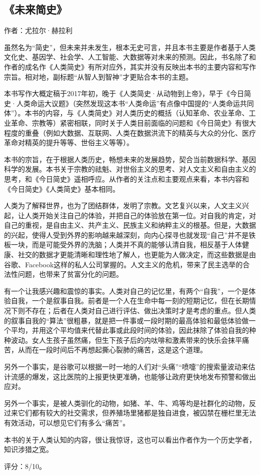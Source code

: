 \subsection{《未来简史》}

作者：尤拉尔·赫拉利

虽然名为“简史”，但未来并未发生，根本无史可言，并且本书主要是作者基于人类文化史、基因学、社会学、人工智能、大数据等对未来的预测。因此，书名除了和作者的成名作《人类简史》有所对应外，其实并没有反映出本书的主要内容和写作宗旨。相对地，副标题“从智人到智神”才更贴合本书的主题。

本书写作大概定稿于2017年初，晚于《人类简史·从动物到上帝》，早于《今日简史·人类命运大议题》（突然发现这本书“人类命运”有点像中国提的“人类命运共同体”）。本书的内容，与《人类简史》对人类历史的概括（认知革命、农业革命、工业革命、宗教等）紧密相联，同时关于人类目前面临的问题和《今日简史》有很大程度的重叠（例如大数据、互联网、人类在数据洪流下的精英与大众的分化、医疗革命对精英的提升等等、世俗主义等等）。

本书的宗旨，在于根据人类历史，畅想未来的发展趋势，契合当前数据科学、基因科学的发展。本书关于宗教的祛魁、对世俗主义的思考、对人文主义和自由主义的思考，和《今日简史》遥相呼应。从作者的关注点和主要观点来看，本书内容和《今日简史》《人类简史》基本相同。

人类为了解释世界，也为了团结群体，发明了宗教。文艺复兴以来，人文主义兴起，让人类开始关注自己的体验，并把自己的体验放在第一位。对自我的肯定，对自己的重视，是自由主义、共产主义、民族主义和纳粹主义的根基。但是，大数据的兴起，使得人受到外界的影响越来越深刻，向内心探寻也就发现“自己”并不是铁板一块，而是可能受外界的洗脑；人类并不真的能够认清自我，相反基于人体健康、社交的数据才更能清晰和理性地了解人，也更能为人做决定，而这些数据是由谷歌、Facebook这样的私人公司掌握的。人文主义的危机，带来了民主选举的合法性问题，也带来了贫富分化的问题。

有一个让我感兴趣和震惊的事实。人类对自己的记忆里，有两个“自我”，一个是体验自我，一个是叙事自我。前者是一个人在生命中每一刻的短期记忆，但在长期情况下则不存在；后者在人类对自己进行评估、做出决策时才是考虑的重点。但人类的叙事自我的“算法”很粗暴，就是把一件事或一段时期的最高体验和最低体验做一个平均，并用这个平均值来代替此事或此段时间的体验，因此抹除了体验自我的种种波动。女人生孩子虽然痛，但生下孩子后的内呔啡和激素带来的快乐会抹平痛苦，从而在一段时间后不再想起撕心裂肺的痛苦，这是这个道理。

另外一个事实，是谷歌可以根据一时一地的人们对“头痛”“喷嚏”的搜索量波动来估计流感的爆发，这比医院的上报更快更准确，也能够让政府更快地发布预警和做出应对。

另外一个事实，是被人类驯化的动物，如猪、羊、牛、鸡等均是社群化的动物，反过来它们都有较大的社交需求，但养殖场里猪都是独自进食，被囚禁在栅栏里无法有效活动，可以想见它们有多么“痛苦”。

本书的关于人类认知的内容，很让我惊讶，这也可以看出作者作为一个历史学者，知识涉猎之宽。

评分：8/10。
